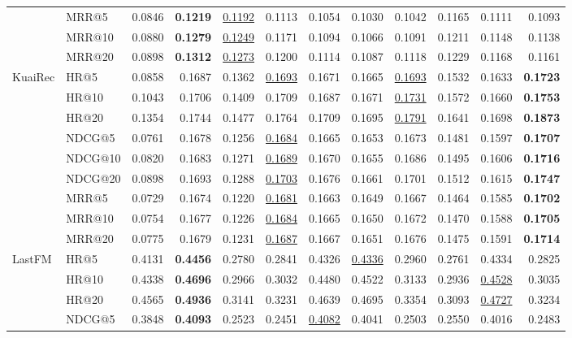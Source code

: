 \begin{tabular}{llrrrrrrrrrr}
 & MRR@5 & 0.0846 & \textbf{0.1219} & \underline{0.1192} & 0.1113 & 0.1054 & 0.1030 & 0.1042 & 0.1165 & 0.1111 & 0.1093 \\
 & MRR@10 & 0.0880 & \textbf{0.1279} & \underline{0.1249} & 0.1171 & 0.1094 & 0.1066 & 0.1091 & 0.1211 & 0.1148 & 0.1138 \\
 & MRR@20 & 0.0898 & \textbf{0.1312} & \underline{0.1273} & 0.1200 & 0.1114 & 0.1087 & 0.1118 & 0.1229 & 0.1168 & 0.1161 \\
\hline
KuaiRec & HR@5 & 0.0858 & 0.1687 & 0.1362 & \underline{0.1693} & 0.1671 & 0.1665 & \underline{0.1693} & 0.1532 & 0.1633 & \textbf{0.1723} \\
 & HR@10 & 0.1043 & 0.1706 & 0.1409 & 0.1709 & 0.1687 & 0.1671 & \underline{0.1731} & 0.1572 & 0.1660 & \textbf{0.1753} \\
 & HR@20 & 0.1354 & 0.1744 & 0.1477 & 0.1764 & 0.1709 & 0.1695 & \underline{0.1791} & 0.1641 & 0.1698 & \textbf{0.1873} \\
 & NDCG@5 & 0.0761 & 0.1678 & 0.1256 & \underline{0.1684} & 0.1665 & 0.1653 & 0.1673 & 0.1481 & 0.1597 & \textbf{0.1707} \\
 & NDCG@10 & 0.0820 & 0.1683 & 0.1271 & \underline{0.1689} & 0.1670 & 0.1655 & 0.1686 & 0.1495 & 0.1606 & \textbf{0.1716} \\
 & NDCG@20 & 0.0898 & 0.1693 & 0.1288 & \underline{0.1703} & 0.1676 & 0.1661 & 0.1701 & 0.1512 & 0.1615 & \textbf{0.1747} \\
 & MRR@5 & 0.0729 & 0.1674 & 0.1220 & \underline{0.1681} & 0.1663 & 0.1649 & 0.1667 & 0.1464 & 0.1585 & \textbf{0.1702} \\
 & MRR@10 & 0.0754 & 0.1677 & 0.1226 & \underline{0.1684} & 0.1665 & 0.1650 & 0.1672 & 0.1470 & 0.1588 & \textbf{0.1705} \\
 & MRR@20 & 0.0775 & 0.1679 & 0.1231 & \underline{0.1687} & 0.1667 & 0.1651 & 0.1676 & 0.1475 & 0.1591 & \textbf{0.1714} \\
\hline
LastFM & HR@5 & 0.4131 & \textbf{0.4456} & 0.2780 & 0.2841 & 0.4326 & \underline{0.4336} & 0.2960 & 0.2761 & 0.4334 & 0.2825 \\
 & HR@10 & 0.4338 & \textbf{0.4696} & 0.2966 & 0.3032 & 0.4480 & 0.4522 & 0.3133 & 0.2936 & \underline{0.4528} & 0.3035 \\
 & HR@20 & 0.4565 & \textbf{0.4936} & 0.3141 & 0.3231 & 0.4639 & 0.4695 & 0.3354 & 0.3093 & \underline{0.4727} & 0.3234 \\
 & NDCG@5 & 0.3848 & \textbf{0.4093} & 0.2523 & 0.2451 & \underline{0.4082} & 0.4041 & 0.2503 & 0.2550 & 0.4016 & 0.2483 \\

\end{tabular}
